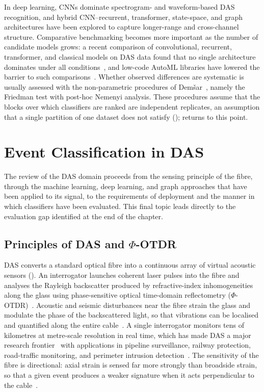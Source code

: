 In deep learning, CNNs dominate spectrogram- and waveform-based DAS recognition, and hybrid CNN--recurrent, transformer, state-space, and graph architectures have been explored to capture longer-range and cross-channel structure. Comparative benchmarking becomes more important as the number of candidate models grows: a recent comparison of convolutional, recurrent, transformer, and classical models on DAS data found that no single architecture dominates under all conditions~\cite{shi2025benchmarking}, and low-code AutoML libraries have lowered the barrier to such comparisons~\cite{ali2020pycaret}. Whether observed differences are systematic is usually assessed with the non-parametric procedures of Dem\v{s}ar~\cite{demsar2006statistical}, namely the Friedman test with post-hoc Nemenyi analysis. These procedures assume that the blocks over which classifiers are ranked are independent replicates, an assumption that a single partition of one dataset does not satisfy ();  returns to this point.

\section{Event Classification in DAS}
\label{sec:chap2DAS}
The review of the DAS domain proceeds from the sensing principle of the fibre, through the machine learning, deep learning, and graph approaches that have been applied to its signal, to the requirements of deployment and the manner in which classifiers have been evaluated. This final topic leads directly to the evaluation gap identified at the end of the chapter.

\subsection{Principles of DAS and \texorpdfstring{$\Phi$-OTDR}{Phi-OTDR}}
\label{sec:chap2DASprinciples}
DAS converts a standard optical fibre into a continuous array of virtual acoustic sensors (). An interrogator launches coherent laser pulses into the fibre and analyses the Rayleigh backscatter produced by refractive-index inhomogeneities along the glass using phase-sensitive optical time-domain reflectometry ($\Phi$-OTDR)~\cite{he2021review,liu2025advances}. Acoustic and seismic disturbances near the fibre strain the glass and modulate the phase of the backscattered light, so that vibrations can be localised and quantified along the entire cable~\cite{hartog2017introduction}. A single interrogator monitors tens of kilometres at metre-scale resolution in real time, which has made DAS a major research frontier~\cite{shang2022das} with applications in pipeline surveillance, railway protection, road-traffic monitoring, and perimeter intrusion detection~\cite{wu2024pipeline,yurekli2025railway,deng2025roadtraffic,juarez2005intrusion}. The sensitivity of the fibre is directional: axial strain is sensed far more strongly than broadside strain, so that a given event produces a weaker signature when it acts perpendicular to the cable~\cite{zhan2020das}.

